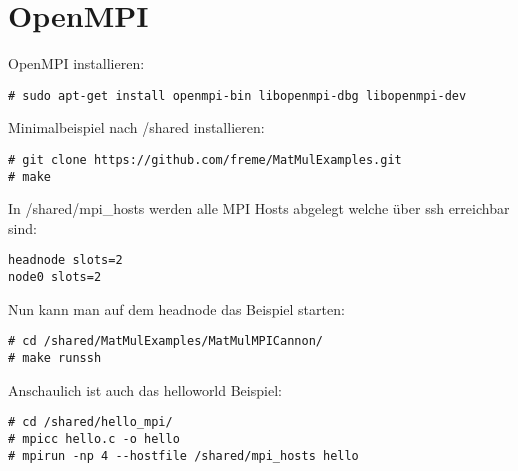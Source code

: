 \chapter{OpenMPI}
OpenMPI installieren:
\begin{lstlisting}[style=Bash]
# sudo apt-get install openmpi-bin libopenmpi-dbg libopenmpi-dev
\end{lstlisting}
Minimalbeispiel nach /shared installieren:
\begin{lstlisting}[style=Bash]
# git clone https://github.com/freme/MatMulExamples.git
# make
\end{lstlisting}
In /shared/mpi\_hosts werden alle MPI Hosts abgelegt welche über ssh erreichbar sind:
\begin{lstlisting}[style=Bash]
headnode slots=2
node0 slots=2
\end{lstlisting}
Nun kann man auf dem headnode das Beispiel starten:
\begin{lstlisting}[style=Bash]
# cd /shared/MatMulExamples/MatMulMPICannon/
# make runssh
\end{lstlisting}
Anschaulich ist auch das helloworld Beispiel:
\begin{lstlisting}[style=Bash]
# cd /shared/hello_mpi/
# mpicc hello.c -o hello 
# mpirun -np 4 --hostfile /shared/mpi_hosts hello
\end{lstlisting}
